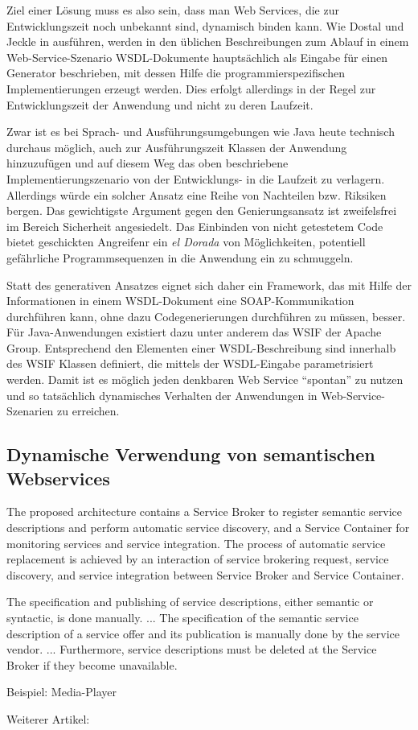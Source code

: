 Ziel einer Lösung muss es also sein, dass man Web Services, die zur Entwicklungszeit noch unbekannt sind, dynamisch binden kann. Wie Dostal und Jeckle in \cite[S.61]{xmlspek4} ausführen, werden in den üblichen Beschreibungen zum Ablauf in einem Web-Service-Szenario \ac{WSDL}-Dokumente hauptsächlich als Eingabe für einen Generator beschrieben, mit dessen Hilfe die programmierspezifischen Implementierungen erzeugt werden. Dies erfolgt allerdings in der Regel zur Entwicklungszeit der Anwendung und nicht zu deren Laufzeit.

Zwar ist es bei Sprach- und Ausführungsumgebungen wie Java heute technisch durchaus möglich, auch zur Ausführungszeit Klassen der Anwendung hinzuzufügen und auf diesem Weg das oben beschriebene Implementierungszenario von der Entwicklungs- in die Laufzeit zu verlagern. Allerdings würde ein solcher Ansatz eine Reihe von Nachteilen bzw. Riksiken bergen. Das gewichtigste Argument gegen den Genierungsansatz ist zweifelsfrei im Bereich Sicherheit angesiedelt. Das Einbinden von nicht getestetem Code bietet geschickten Angreifenr ein \emph{el Dorada} von Möglichkeiten, potentiell gefährliche Programmsequenzen in die Anwendung ein zu schmuggeln.

Statt des generativen Ansatzes eignet sich daher ein Framework, das mit Hilfe der Informationen in einem \ac{WSDL}-Dokument eine \ac{SOAP}-Kommunikation durchführen kann, ohne dazu Codegenerierungen durchführen zu müssen, besser. Für Java-Anwendungen existiert dazu unter anderem das \ac{WSIF} der Apache Group. Entsprechend den Elementen einer WSDL-Beschreibung sind innerhalb des \ac{WSIF} Klassen definiert, die mittels der \ac{WSDL}-Eingabe parametrisiert werden. Damit ist es möglich jeden denkbaren Web Service "`spontan"' zu nutzen und so tatsächlich dynamisches Verhalten der Anwendungen in Web-Service-Szenarien zu erreichen.





\subsection{Dynamische Verwendung von semantischen Webservices}

The proposed architecture contains a Service Broker to
register semantic service descriptions and perform automatic
service discovery, and a Service Container for monitoring
services and service integration. The process of automatic
service replacement is achieved by an interaction of service
brokering request, service discovery, and service integration
between Service Broker and Service Container. \cite[S.410]{flexbrok}

The specification
and publishing of service descriptions, either semantic
or syntactic, is done manually. ... The specification
of the semantic service description of a service offer and its
publication is manually done by the service vendor. ... Furthermore, service descriptions must be deleted at the
Service Broker if they become unavailable. \cite[S.416]{flexbrok}

Beispiel: Media-Player \cite[S.418]{flexbrok}

Weiterer Artikel: \cite{ccube}

